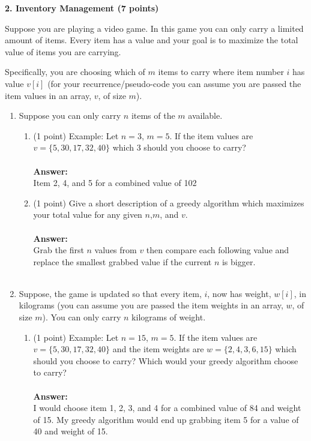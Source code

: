 \documentclass[12pt]{elsart}
\begin{document}
{\bf 2.  Inventory Management (7 points)}

Suppose you are playing a video game.  In this game you can only carry a limited amount of items.  Every item has a value and your goal is to maximize the total value of items you are carrying.  

Specifically, you are choosing which of $m$ items to carry where item number $i$ has value $v[i]$ (for your recurrence/pseudo-code you can assume you are passed the item values  in an array, $v$, of size $m$).  

\begin{enumerate}
   \item Suppose you can only carry $n$ items of the $m$ available.
   \begin{enumerate}
      \item (1 point) Example: Let $n=3$, $m=5$.  If the item values are $v=\{5,30,17,32,40\}$ which $3$ should you choose to carry?\\\\
	{\bf Answer:}\\
	Item 2, 4, and 5 for a combined value of 102\\
      \item (1 point) Give a short description of a greedy algorithm which maximizes your total value for any given $n$,$m$, and $v$.\\\\
	{\bf Answer:}\\
	Grab the first $n$ values from $v$ then compare each following value and replace the smallest grabbed value if the current $n$ is bigger.\\\\
   \end{enumerate}
\newpage
   \item Suppose, the game is updated so that every item, $i$, now has weight, $w[i]$, in kilograms (you can assume you are passed the item weights in an array, $w$, of size $m$).  You can only carry $n$ kilograms of weight.
   \begin{enumerate}
      \item (1 point) Example: Let $n=15$, $m=5$.  If the item values are $v=\{5,30,17,32,40\}$ and the item weights are $w=\{2,4,3,6,15\}$ which should you choose to carry?  Which would your greedy algorithm choose to carry?  \\\\
	{\bf Answer:}\\
	I would choose item 1, 2, 3, and 4 for a combined value of 84 and weight of 15. My greedy algorithm would end up grabbing item 5 for a value of 40 and weight of 15.\\\\

\end{enumerate}
\end{enumerate}
\end{document}
